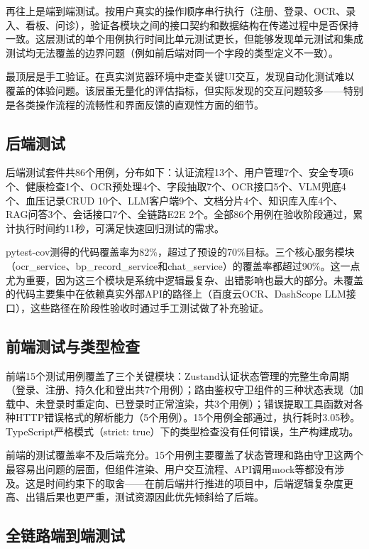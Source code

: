 \documentclass[zihao=-4,a4paper]{ctexart}
\numberwithin{figure}{section}
\numberwithin{table}{section}
\begin{document}
再往上是端到端测试。按用户真实的操作顺序串行执行（注册、登录、OCR、录入、看板、问诊），验证各模块之间的接口契约和数据结构在传递过程中是否保持一致。这层测试的单个用例执行时间比单元测试更长，但能够发现单元测试和集成测试均无法覆盖的边界问题（例如前后端对同一个字段的类型定义不一致）。

最顶层是手工验证。在真实浏览器环境中走查关键UI交互，发现自动化测试难以覆盖的体验问题。该层虽无量化的评估指标，但实际发现的交互问题较多——特别是各类操作流程的流畅性和界面反馈的直观性方面的细节。

\subsection{后端测试}

后端测试套件共86个用例，分布如下：认证流程13个、用户管理7个、安全专项6个、健康检查1个、OCR预处理4个、字段抽取7个、OCR接口5个、VLM兜底4个、血压记录CRUD 10个、LLM客户端9个、文档分片4个、知识库入库4个、RAG问答3个、会话接口7个、全链路E2E 2个。全部86个用例在验收阶段通过，累计执行时间约11秒，可满足快速回归测试的需求。

pytest-cov测得的代码覆盖率为82\%，超过了预设的70\%目标。三个核心服务模块（ocr\_service、bp\_record\_service和chat\_service）的覆盖率都超过90\%。这一点尤为重要，因为这三个模块是系统中逻辑最复杂、出错影响也最大的部分。未覆盖的代码主要集中在依赖真实外部API的路径上（百度云OCR、DashScope LLM接口），这些路径在阶段性验收时通过手工测试做了补充验证。

\subsection{前端测试与类型检查}

前端15个测试用例覆盖了三个关键模块：Zustand认证状态管理的完整生命周期（登录、注册、持久化和登出共7个用例）；路由鉴权守卫组件的三种状态表现（加载中、未登录时重定向、已登录时正常渲染，共3个用例）；错误提取工具函数对各种HTTP错误格式的解析能力（5个用例）。15个用例全部通过，执行耗时3.05秒。TypeScript严格模式（strict: true）下的类型检查没有任何错误，生产构建成功。

前端的测试覆盖率不及后端充分。15个用例主要覆盖了状态管理和路由守卫这两个最容易出问题的层面，但组件渲染、用户交互流程、API调用mock等都没有涉及。这是时间约束下的取舍——在前后端并行推进的项目中，后端逻辑复杂度更高、出错后果也更严重，测试资源因此优先倾斜给了后端。

\subsection{全链路端到端测试}
\end{document}

